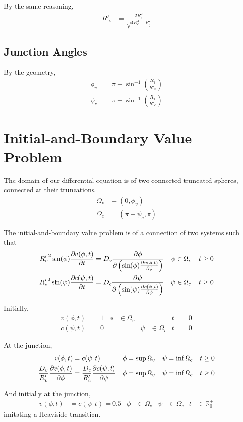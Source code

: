 \documentclass{report}
\newcommand\Par[1]{{ \left({#1}\right) }}
\newcommand\bbR{{ \mathbb{R} }}
\newcommand\Rc{{ R'_c }}
\newcommand\Rv{{ R'_v }}
\begin{document}
By the same reasoning,
\begin{align*}
	\Rc &= \frac{2R_c^2}{\sqrt{4R_c^2 - R_j^2}}
\end{align*}

\subsection{Junction Angles}
By the geometry,
\begin{align*}
	\phi_v &= \pi - \sin^{-1}\Par{\frac{R_j}{\Rv}} \\
	\psi_c &= \pi - \sin^{-1}\Par{\frac{R_j}{\Rc}}
\end{align*}

\section{Initial-and-Boundary Value Problem}
The domain of our differential equation is of two connected truncated spheres, connected at their truncations.
\begin{align*}
	\Omega_v &= (0, \phi_v) \\
	\Omega_c &= (\pi - \psi_c, \pi)
\end{align*}

The initial-and-boundary value problem is of a connection of two systems such that
\begin{align*}
	\Rv^2 \sin(\phi) \pdv{v(\phi, t)}{t} &= D_v \pdv\phi \Par{\sin(\phi) \pdv{v(\phi, t)}{\phi}}
	& \phi &\in \Omega_v
	& t &\geq 0 \\
	\Rc^2 \sin(\psi) \pdv{c(\psi, t)}{t} &= D_c \pdv\psi \Par{\sin(\psi) \pdv{c(\psi, t)}{\psi}}
	& \psi &\in \Omega_c
	& t &\geq 0
\end{align*}

Initially,
\begin{align*}
	v(\phi, t) &= 1 & \phi &\in \Omega_v & & & t &= 0 \\
	c(\psi, t) &= 0 & & & \psi &\in \Omega_c & t &= 0
\end{align*}

At the junction,
\begin{align*}
	v(\phi, t) &= c(\psi, t)
	& \phi &= \sup\Omega_v
	& \psi &= \inf\Omega_c
	& t &\geq 0 \\
	\frac{D_v}{\Rv} \pdv{v(\phi, t)}{\phi} &= \frac{D_c}{\Rc} \pdv{c(\psi, t)}{\psi}
	& \phi &= \sup\Omega_v
	& \psi &= \inf\Omega_c
	& t &\geq 0
\end{align*}

And initially at the junction,
\begin{align*}
	v(\phi, t) &= c(\psi, t) = 0.5 & \phi &\in \Omega_v & \psi &\in \Omega_c & t &\in \bbR_0^+
\end{align*}
imitating a Heaviside transition.
\end{document}
